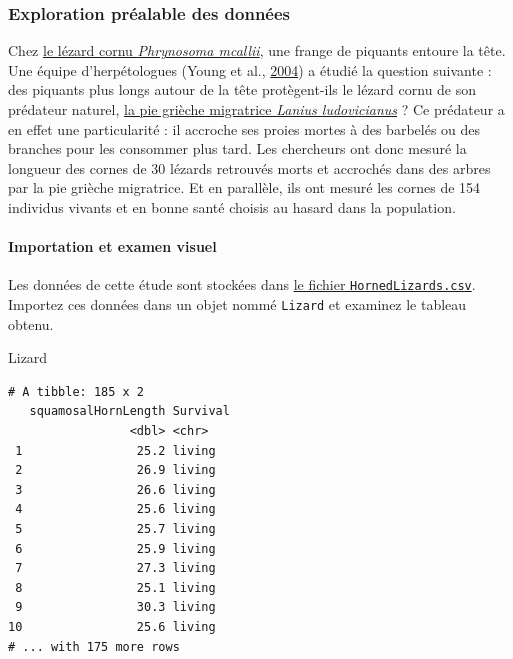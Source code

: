 \documentclass[a4paperpaper,]{article}
\newenvironment{Shaded}{\begin{snugshade}}{\end{snugshade}}
\newcommand{\NormalTok}[1]{\textcolor[rgb]{0.12,0.11,0.11}{#1}}
\let\oldparagraph\paragraph
\renewcommand{\paragraph}[1]{\oldparagraph{#1}\mbox{}}
\begin{document}
\hypertarget{exploration-pruxe9alable-des-donnuxe9es}{%
\subsubsection{Exploration préalable des données}\label{exploration-pruxe9alable-des-donnuxe9es}}

Chez \href{https://fr.wikipedia.org/wiki/Phrynosoma_mcallii}{le lézard cornu \emph{Phrynosoma mcallii}}, une frange de piquants entoure la tête. Une équipe d'herpétologues (Young et al., \protect\hyperlink{ref-Young2004}{2004}) a étudié la question suivante : des piquants plus longs autour de la tête protègent-ils le lézard cornu de son prédateur naturel, \href{https://fr.wikipedia.org/wiki/Pie-grièche_migratrice}{la pie grièche migratrice \emph{Lanius ludovicianus}} ? Ce prédateur a en effet une particularité : il accroche ses proies mortes à des barbelés ou des branches pour les consommer plus tard. Les chercheurs ont donc mesuré la longueur des cornes de 30 lézards retrouvés morts et accrochés dans des arbres par la pie grièche migratrice. Et en parallèle, ils ont mesuré les cornes de 154 individus vivants et en bonne santé choisis au hasard dans la population.

\hypertarget{importation-et-examen-visuel-2}{%
\paragraph{Importation et examen visuel}\label{importation-et-examen-visuel-2}}

Les données de cette étude sont stockées dans \href{https://besibo.github.io/Biometrie3/data/HornedLizards.csv}{le fichier \texttt{HornedLizards.csv}}. Importez ces données dans un objet nommé \texttt{Lizard} et examinez le tableau obtenu.

\begin{Shaded}
\begin{Highlighting}[]
\NormalTok{Lizard}
\end{Highlighting}
\end{Shaded}

\begin{verbatim}
# A tibble: 185 x 2
   squamosalHornLength Survival
                 <dbl> <chr>   
 1                25.2 living  
 2                26.9 living  
 3                26.6 living  
 4                25.6 living  
 5                25.7 living  
 6                25.9 living  
 7                27.3 living  
 8                25.1 living  
 9                30.3 living  
10                25.6 living  
# ... with 175 more rows
\end{verbatim}
\end{document}
